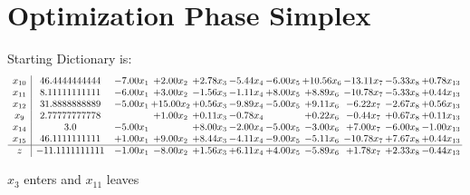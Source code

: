 \documentclass[9pt]{article}
\begin{document}
\section{Optimization Phase Simplex}
Starting Dictionary is:
\[\begin{array}{c| c c@{\hskip 2pt} c@{\hskip 2pt} c@{\hskip 2pt} c@{\hskip 2pt} c@{\hskip 2pt} c@{\hskip 2pt} c@{\hskip 2pt} c@{\hskip 2pt} c@{\hskip 2pt} }
 x_{10}   &  46.4444444444 & -7.00 x_{1} & +  2.00 x_{2} & +  2.78 x_{3} & -5.44 x_{4} & -6.00 x_{5} & + 10.56 x_{6} & -13.11 x_{7} & -5.33 x_{8} & +  0.78 x_{13}\\
 x_{11}   &  8.11111111111 & -6.00 x_{1} & +  3.00 x_{2} & -1.56 x_{3} & -1.11 x_{4} & +  8.00 x_{5} & +  8.89 x_{6} & -10.78 x_{7} & -5.33 x_{8} & +  0.44 x_{13}\\
 x_{12}   &  31.8888888889 & -5.00 x_{1} & + 15.00 x_{2} & +  0.56 x_{3} & -9.89 x_{4} & -5.00 x_{5} & +  9.11 x_{6} & -6.22 x_{7} & -2.67 x_{8} & +  0.56 x_{13}\\
 x_{9}   &  2.77777777778  &   & +  1.00 x_{2} & +  0.11 x_{3} & -0.78 x_{4} &   & +  0.22 x_{6} & -0.44 x_{7} & +  0.67 x_{8} & +  0.11 x_{13}\\
 x_{14}   &  3.0 & -5.00 x_{1} &   & +  8.00 x_{3} & -2.00 x_{4} & -5.00 x_{5} & -3.00 x_{6} & +  7.00 x_{7} & -6.00 x_{8} & -1.00 x_{13}\\
 x_{15}   &  46.1111111111 & +  1.00 x_{1} & +  9.00 x_{2} & +  8.44 x_{3} & -4.11 x_{4} & -9.00 x_{5} & -5.11 x_{6} & -10.78 x_{7} & +  7.67 x_{8} & +  0.44 x_{13}\\
\hline
z    &  -11.1111111111 & -1.00 x_{1} & -8.00 x_{2} & +  1.56 x_{3} & +  6.11 x_{4} & +  4.00 x_{5} & -5.89 x_{6} & +  1.78 x_{7} & +  2.33 x_{8} & -0.44 x_{13}\\
\end{array}\]


 $ x_{3} $ enters and $ x_{11} $ leaves 
\end{document}
